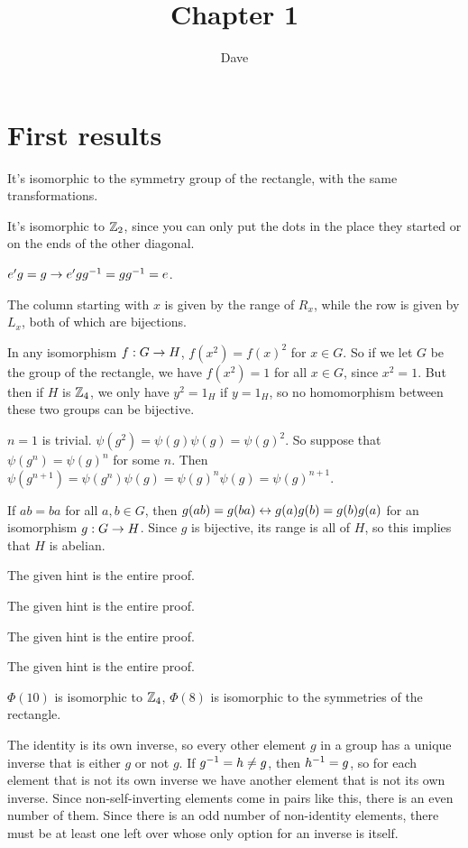 \documentclass[11pt, oneside]{article}   	%
\title{Chapter 1}
\author{Dave}
\begin{document}
\maketitle

\section{First results}
\be
\item It's isomorphic to the symmetry group of the rectangle, with the same transformations.
\item It's isomorphic to $\mathbb{Z}_2$, since you can only put the dots in the place they started or on the ends of the other diagonal.
\item $e'g = g \rightarrow e'gg^{-1} = gg^{-1} = e$.
\item The column starting with $x$ is given by the range of $R_x$, while the row is given by $L_x$, both of which are bijections.
\item In any isomorphism $f: G \rightarrow H$, $f(x^2) = f(x)^2$ for $x \in G$. So if we let $G$ be the group of the rectangle, we have $f(x^2) = 1$ for all $x \in G$, since $x^2 = 1$. But then if $H$ is $\mathbb{Z}_4$, we only have $y^2 = 1_H$ if $y = 1_H$, so no homomorphism between these two groups can be bijective.
\item $n=1$ is trivial. $\psi(g^2) = \psi(g)\psi(g) = \psi(g)^2$. So suppose that $\psi(g^n) = \psi(g)^n$ for some $n$. Then $\psi(g^{n+1}) = \psi(g^n)\psi(g) = \psi(g)^n\psi(g) = \psi(g)^{n + 1}$. 
\item  If $ab = ba$ for all $a, b \in G$, then $g(ab) = g(ba) \leftrightarrow g(a)g(b) = g(b)g(a)$ for an isomorphism $g: G \rightarrow H$. Since $g$ is bijective, its range is all of $H$, so this implies that $H$ is abelian.
\item The given hint is the entire proof.
\item The given hint is the entire proof.
\item The given hint is the entire proof.
\item The given hint is the entire proof.
\item $\Phi(10)$ is isomorphic to $\mathbb{Z}_4$, $\Phi(8)$ is isomorphic to the symmetries of the rectangle.
\item The identity is its own inverse, so every other element $g$ in a group has a unique inverse that is either $g$ or not $g$. If $g^{-1} = h \not= g$, then $h^{-1} = g$, so for each element that is not its own inverse we have another element that is not its own inverse. Since non-self-inverting elements come in pairs like this, there is an even number of them. Since there is an odd number of non-identity elements, there must be at least one left over whose only option for an inverse is itself.
\end{document}
